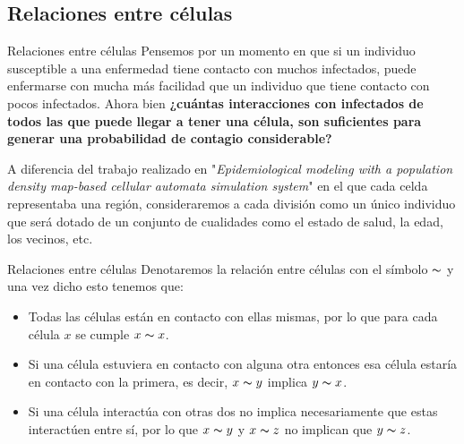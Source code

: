 \documentclass[9pt]{beamer}
\begin{document}
\subsection{Relaciones entre células}
\begin{frame}{Relaciones entre células}
Pensemos por un momento en que si un individuo susceptible a una enfermedad tiene contacto con muchos infectados, puede enfermarse con mucha más facilidad que un individuo que tiene contacto con pocos infectados. Ahora bien \textbf{¿cuántas interacciones con infectados de todos las que puede llegar a tener una célula, son suficientes para generar una probabilidad de contagio considerable?}

A diferencia del trabajo realizado en "\textit{Epidemiological modeling with a population density map-based cellular automata simulation system}" \cite{populationDensity} en el que cada celda representaba una región, consideraremos a cada división como un único individuo que será dotado de un conjunto de cualidades como el estado de salud, la edad, los vecinos, etc.
\end{frame}

\begin{frame}{Relaciones entre células}
Denotaremos la relación entre células con el símbolo $\thicksim$ y una vez dicho esto tenemos que:

\begin{itemize}
    \item Todas las células están en contacto con ellas mismas, por lo que para cada célula $x$ se cumple $x \thicksim x$.
    \item Si una célula estuviera en contacto con alguna otra entonces esa célula estaría en contacto con la primera, es decir, $x\thicksim y$ implica $y\thicksim x$.
    \item Si una célula interactúa con otras dos no implica necesariamente que estas interactúen entre sí, por lo que $x\thicksim y$ y $x\thicksim z$ no implican que $y\thicksim z$.
\end{itemize}
\end{frame}
\end{document}
